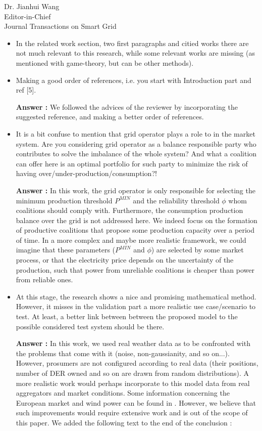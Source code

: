 \documentclass{letter}
\begin{document}
\begin{letter}{Dr. Jianhui Wang \\ Editor-in-Chief \\ Journal Transactions on Smart Grid }
\begin{itemize}
\begin{itemize}
		\item In the related work section, two first paragraphs and citied works there are not much relevant to this research, while some relevant works are missing (as mentioned with game-theory, but can be other methods).

		\item Making a good order of references, i.e. you start with Introduction part and ref [5].

		\textbf{Answer :}  We followed the advices of the reviewer by incorporating the suggested reference, and making a better order of references.
		
		\item It is a bit confuse to mention that grid operator plays a role to in the market system. Are you considering grid operator as a balance responsible party who contributes to solve the imbalance of the whole system? And what a coalition can offer here is an optimal portfolio for such party to minimize the risk of having over/under-production/consumption?!
		
		\textbf{Answer :} In this work, the grid operator is only responsible for selecting the minimum production threshold $P^{MIN}$ and the reliability threshold $ \phi $ whom coalitions should comply with. Furthermore, the consumption production balance over the grid is not addressed here. We indeed focus on the formation of productive coalitions that propose some production capacity over a period of time. In a more complex and maybe more realistic framework, we could imagine that these parameters ($P^{MIN}$ and $ \phi $) are selected by some market process, or that the electricity price depends on the uncertainty of the production, such that power from unreliable coalitions is cheaper than power from reliable ones. 

		
		\item At this stage, the research shows a nice and promising mathematical method. However, it misses in the validation part a more realistic use case/scenario to test. At least, a better link between between the proposed model to the possible considered test system should be there.
		
		\textbf{Answer :} In this work, we used real weather data as to be confronted with the problems that come with it (noise, non-gaussianity, and so on...). However, prosumers are not configured according to real data (their positions, number of DER owned and so on are drawn from random distributions). A more realistic work would perhaps incorporate to this model data from real aggregators and market conditions. Some information concerning the European market and wind power can be found in \cite{Europe}. However, we believe that such improvements would require extensive work and is out of the scope of this paper. We added the following text to the end of the conclusion : 
		

\end{itemize}
\end{itemize}
\end{letter}
\end{document}
